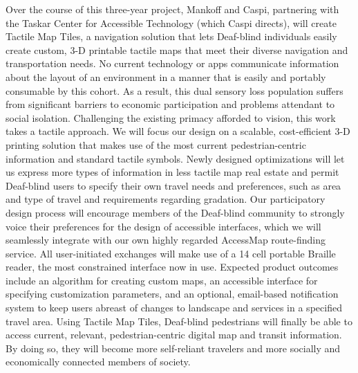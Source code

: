 Over the course of this three-year project, Mankoff and Caspi, partnering with the Taskar Center for Accessible Technology (which Caspi directs), will create Tactile Map Tiles, a navigation solution that lets Deaf-blind individuals easily create custom, 3-D printable tactile maps that meet their diverse navigation and transportation needs. No current technology or apps communicate information about the layout of an environment in a manner that is easily and portably consumable by this cohort. As a result, this dual sensory loss population suffers from significant barriers to economic participation and problems attendant to social isolation.
Challenging the existing primacy afforded to vision, this work takes a tactile approach. We will focus our design on a scalable, cost-efficient 3-D printing solution that makes use of the most current pedestrian-centric information and standard tactile symbols. Newly designed optimizations will let us express more types of information in less tactile map real estate and permit Deaf-blind users to specify their own travel needs and preferences, such as area and type of travel and requirements regarding gradation. Our participatory design process will encourage members of the Deaf-blind community to strongly voice their preferences for the design of accessible interfaces, which we will seamlessly integrate with our own highly regarded AccessMap route-finding service. All user-initiated exchanges will make use of a 14 cell portable Braille reader, the most constrained interface now in use.
Expected product outcomes include an algorithm for creating custom maps, an accessible interface for specifying customization parameters, and an optional, email-based notification system to keep users abreast of changes to landscape and services in a specified travel area. Using Tactile Map Tiles, Deaf-blind pedestrians will finally be able to access current, relevant, pedestrian-centric digital map and transit information. By doing so, they will become more self-reliant travelers and more socially and economically connected members of society.


